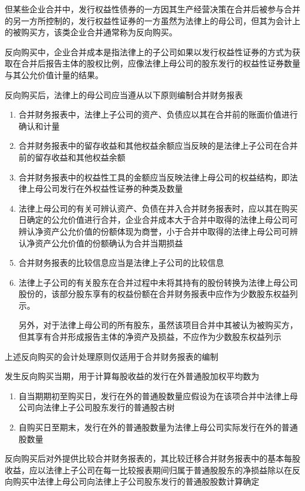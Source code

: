 \documentclass[UTF8,12pt]{ctexart}
\numberwithin{equation}{section} %
\numberwithin{figure}{section}
\numberwithin{table}{section}
\begin{document}
	但某些企业合并中，发行权益性债券的一方因其生产经营决策在合并后被参与合并的另一方所控制的，发行权益性证券的一方虽然为法律上的母公司，但其为会计上的被购买方，该类企业合并通常称为反向购买。
	
	反向购买中，企业合并成本是指法律上的子公司如果以发行权益性证券的方式为获取在合并后报告主体的股权比例，应像法律上母公司的股东发行的权益性证券数量与其公允价值计量的结果。
	
	反向购买后，法律上的母公司应当遵从以下原则编制合并财务报表
	\begin{enumerate}
		\item 合并财务报表中，法律上子公司的资产、负债应以其在合并前的账面价值进行确认和计量
		
		\item 合并财务报表中的留存收益和其他权益余额应当反映的是法律上子公司在合并前的留存收益和其他权益余额
		
		\item 合并财务报表中的权益性工具的金额应当反映法律上母公司的权益结构，即法律上母公司发行在外权益性证券的种类及数量
		
		\item 法律上母公司的有关可辨认资产、负债在并入合并财务报表时，应以其在购买日确定的公允价值进行合并，企业合并成本大于合并中取得的法律上母公司可辨认净资产公允价值的份额体现为商誉，小于合并中取得的法律上母公司可辨认净资产公允价值的份额确认为合并当期损益
		
		\item 合并财务报表的比较信息应当是法律上子公司的比较信息
		
		\item 法律上子公司的有关股东在合并过程中未将其持有的股份转换为法律上母公司股份的，该部分股东享有的权益份额在合并财务报表中应作为少数股东权益列示。
		
		另外，对于法律上母公司的所有股东，虽然该项目合并中其被认为被购买方，但其享有合并形成报告主体的净资产及损益，不应作为少数股东权益列示
	\end{enumerate}
	上述反向购买的会计处理原则仅适用于合并财务报表的编制
	
	发生反向购买当期，用于计算每股收益的发行在外普通股加权平均数为
	\begin{enumerate}
		\item 自当期期初至购买日，发行在外的普通股数量应假设为在该项合并中法律上母公司向法律上子公司股东发行的普通股古树
		
		\item 自购买日至期末，发行在外的普通股数量为法律上母公司实际发行在外的普通股数量
	\end{enumerate}
	反向购买后对外提供比较合并财务报表的，其比较迁移合并财务报表中的基本每股收益，应以法律上子公司在每一比较报表期间归属于普通股股东的净损益除以在反向购买中法律上母公司向法律上子公司股东发行的普通股股数计算确定
	
\end{document}

